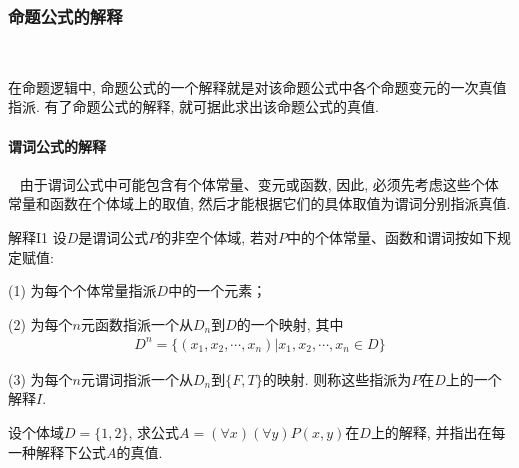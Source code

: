 \subsubsection{命题公式的解释}~{}

在命题逻辑中, 命题公式的一个解释就是对该命题公式中各个命题变元的一次真值指派. 有了命题公式的解释, 就可据此求出该命题公式的真值.
\paragraph{谓词公式的解释}~{}
由于谓词公式中可能包含有个体常量、变元或函数, 因此, 必须先考虑这些个体常量和函数在个体域上的取值, 然后才能根据它们的具体取值为谓词分别指派真值.

\begin{mydef}{解释I}{1}
设$D$是谓词公式$P$的非空个体域, 若对$P$中的个体常量、函数和谓词按如下规定赋值:

(1) 为每个个体常量指派$D$中的一个元素；

(2) 为每个$n$元函数指派一个从$D_n$到$D$的一个映射, 其中
\begin{align}
  D^n =\{(x_1, x_2,\cdots, x_n)| x_1, x_2, \cdots, x_n\in D\}
\end{align}

(3) 为每个$n$元谓词指派一个从$D_n$到$\{F, T\}$的映射.  则称这些指派为$P$在$D$上的一个解释$I$.
\end{mydef}
\begin{example}
    设个体域$D=\{1, 2\}$, 求公式$A=(\forall x)( \forall y)P(x, y)$在$D$上的解释, 并指出在每一种解释下公式$A$的真值.
\end{example}
